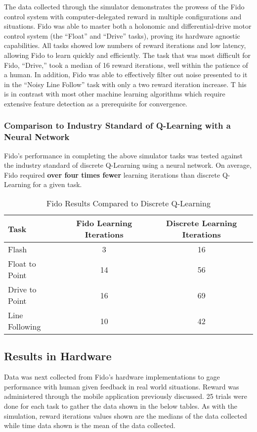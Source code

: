 The data collected through the simulator demonstrates the prowess of the Fido control system with computer-delegated reward in multiple configurations and situations.
Fido was able to master both a holonomic and differential-drive motor control system (the ``Float'' and ``Drive'' tasks), proving its hardware agnostic capabilities.
All tasks showed low numbers of reward iterations and low latency, allowing Fido to learn quickly and efficiently.
The task that was most difficult for Fido, ``Drive,'' took a median of 16 reward iterations, well within the patience of a human.
In addition, Fido was able to effectively filter out noise presented to it in the ``Noisy Line Follow'' task with only a two reward iteration increase. T
his is in contrast with most other machine learning algorithms which require extensive feature detection as a prerequisite for convergence.  

\subsubsection{Comparison to Industry Standard of Q-Learning with a Neural Network}

Fido's performance in completing the above simulator tasks was tested against the industry standard of discrete Q-Learning using a neural network.  On average, Fido required \textbf{over four times fewer} learning iterations than discrete Q-Learning for a given task.

\begin{table}[ht]
	\centering
	\begin{tabular}{lcc}
		\toprule
		Task       		  & Fido Learning Iterations & Discrete Learning Iterations \\ \midrule
		Flash             & 3   & 16  \\
		Float to Point    & 14  & 56  \\
		Drive to Point    & 16  & 69  \\
		Line Following    & 10  & 42 \\ \bottomrule
	\end{tabular}
	\caption {Fido Results Compared to Discrete Q-Learning}
	\label{tab:simindustrystandardresults}
\end{table}

\subsection{Results in Hardware}

Data was next collected from Fido's hardware implementations to gage performance with human given feedback in real world situations.
Reward was administered through the mobile application previously discussed.  25 trials were done for each task to gather the data shown in the below tables.  As with the simulation, reward iterations values shown are the medians of the data collected while time data shown is the mean of the data collected.

